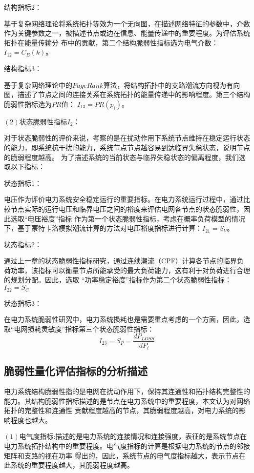 结构指标2：

基于复杂网络理论将系统拓扑等效为一个无向图，在描述网络特征的参数中，介数作为关键参数之一，被描述节点或边在信息、能量传递中的重要程度。为评估系统拓扑在能量传输分
布中的贡献，第二个结构脆弱性指标选为电气介数：$I_{12} = C_B(k)$。

结构指标3：

基于复杂网络理论中的$PageRank$算法，将结构拓扑中的支路潮流方向视为有向图，描述了节点之间的连接关系在系统拓扑的能量传递中的影响程度。第三个结构脆弱性指标选为$PR$值：
$I_{13} = PR(p_i)$。

$(2)$状态脆弱性指标$I_2$：

对于状态脆弱性的评价来说，考察的是在扰动作用下系统节点维持在稳定运行状态的能力，即系统抗干扰的能力，系统节点节点越容易到达临界失稳状态，说明节点的脆弱程度越高。
为了描述系统的当前状态与临界失稳状态的偏离程度，我们选取以下指标：

状态指标1：

电压作为评价电力系统安全稳定运行的重要指标。在电力系统运行过程中，通过比较节点实际的运行电压和临界电压之间的裕度来评估电网各节点的状态脆弱性，因此选取“电压裕度”指标
作为第一个状态脆弱性指标，考虑在概率负荷模型的情况下，基于蒙特卡洛模拟潮流计算的方法对电压裕度指标进行计算：$I_{21} = S_V$。

状态指标2：

通过上一章的状态脆弱性指标研究，通过连续潮流（CPF）计算各节点的临界负荷功率，该指标可以衡量节点所能承受的最大负荷能力，这有利于对负荷进行合理的规划分配。因此，选取
“功率稳定裕度”指标作为第二个状态脆弱性指标：$I_{22} = S_C$

状态指标3：

在电力系统脆弱性研究中，电力系统损耗也是需要重点考虑的一个方面，因此，选取“电网损耗灵敏度”指标第三个状态脆弱性指标：$$I_{23} = S_P = \frac{d P_{LOSS}}{d P_i}$$



\subsection{脆弱性量化评估指标的分析描述}
\label{sec:wordIndex}
电力系统结构脆弱性指的是电网在扰动作用下，保持其连通性和拓扑结构完整性的能力。其结构脆弱性指标描述的是节点在电力系统中的重要程度，本文认为对网络拓扑的完整性和连通性
贡献程度越高的节点，其脆弱程度越高，对电力系统的影响程度也越大。

$(1)$电气度指标:描述的是电力系统的连接情况和连接强度，表征的是系统节点在电力系统拓扑结构中的重要程度。电气度指标的计算是根据电力系统的节点的邻接矩阵和支路的视在功率
得出的，因此，系统节点的电气度指标越大，表示节点在此系统的重要程度越大，其脆弱程度越高。

